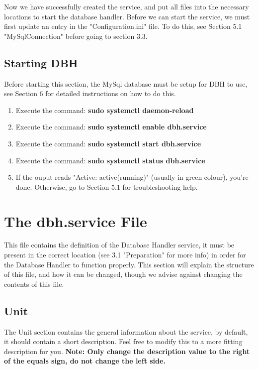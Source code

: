 \documentclass[letterpaper]{article}
\begin{document}
	Now we have successfully created the service, and put all files into the necessary locations to start the database handler. Before we can start the service, we must first update an entry in the "Configuration.ini" file. To do this, see Section 5.1 "MySqlConnection" before going to section 3.3.
	
	\subsection{Starting DBH}
	Before starting this section, the MySql database must be setup for DBH to use, see Section 6 for detailed instructions on how to do this.
	
	\begin{enumerate}
		\item Execute the command: \textbf{sudo systemctl daemon-reload}
		\item Execute the command: \textbf{sudo systemctl enable dbh.service}
		\item Execute the command: \textbf{sudo systemctl start dbh.service}
		\item Execute the command: \textbf{sudo systemctl status dbh.service}
		\item If the ouput reads "Active: active(running)" (usually in green colour), you're done. Otherwise, go to Section 5.1 for troubleshooting help.
	\end{enumerate}
	
	\section{The dbh.service File}
	This file contains the definition of the Database Handler service, it must be present in the correct location (see 3.1 "Preparation" for more info) in order for the Database Handler to function properly. This section will explain the structure of this file, and how it can be changed, though we advise against changing the contents of this file.
	
	\subsection{Unit}
	The Unit section contains the general information about the service, by default, it should contain a short description. Feel free to modify this to a more fitting description for you. \textbf{Note: Only change the description value to the right of the equals sign, do not change the left side.}
	
\end{document}
